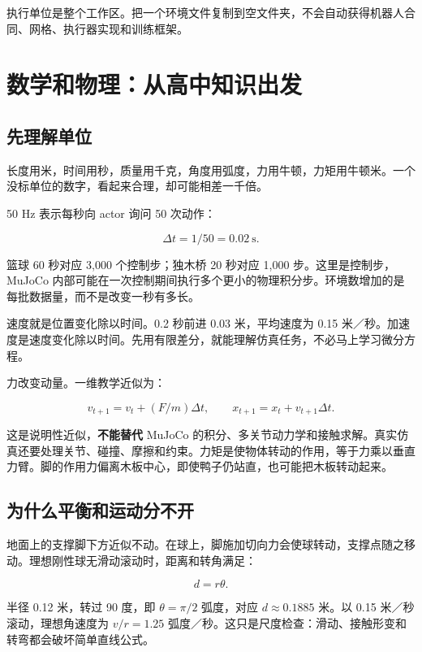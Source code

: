 \documentclass[
  chinese,
  11pt,
  letterpaper,
]{article}
\begin{document}
\endgroup

执行单位是整个工作区。把一个环境文件复制到空文件夹，不会自动获得机器人合同、网格、执行器实现和训练框架。

\section{数学和物理：从高中知识出发}\label{ux6570ux5b66ux548cux7269ux7406ux4eceux9ad8ux4e2dux77e5ux8bc6ux51faux53d1}

\subsection{先理解单位}\label{ux5148ux7406ux89e3ux5355ux4f4d}

长度用米，时间用秒，质量用千克，角度用弧度，力用牛顿，力矩用牛顿米。一个没标单位的数字，看起来合理，却可能相差一千倍。

50 Hz 表示每秒向 actor 询问 50 次动作：

\[\Delta t=1/50=0.02\ \mathrm{s}.\]

篮球 60 秒对应 3,000 个控制步；独木桥 20 秒对应 1,000
步。这里是控制步，MuJoCo
内部可能在一次控制期间执行多个更小的物理积分步。环境数增加的是每批数据量，而不是改变一秒有多长。

速度就是位置变化除以时间。0.2 秒前进 0.03 米，平均速度为 0.15
米／秒。加速度是速度变化除以时间。先用有限差分，就能理解仿真任务，不必马上学习微分方程。

力改变动量。一维教学近似为：

\[v_{t+1}=v_t+(F/m)\Delta t,\qquad x_{t+1}=x_t+v_{t+1}\Delta t.\]

这是说明性近似，\textbf{不能替代} MuJoCo
的积分、多关节动力学和接触求解。真实仿真还要处理关节、碰撞、摩擦和约束。力矩是使物体转动的作用，等于力乘以垂直力臂。脚的作用力偏离木板中心，即使鸭子仍站直，也可能把木板转动起来。

\subsection{为什么平衡和运动分不开}\label{ux4e3aux4ec0ux4e48ux5e73ux8861ux548cux8fd0ux52a8ux5206ux4e0dux5f00}

地面上的支撑脚下方近似不动。在球上，脚施加切向力会使球转动，支撑点随之移动。理想刚性球无滑动滚动时，距离和转角满足：

\[d=r\theta.\]

半径 0.12 米，转过 90 度，即 \(\theta=\pi/2\) 弧度，对应
\(d\approx0.1885\) 米。以 0.15 米／秒滚动，理想角速度为 \(v/r=1.25\)
弧度／秒。这只是尺度检查：滑动、接触形变和转弯都会破坏简单直线公式。
\end{document}
